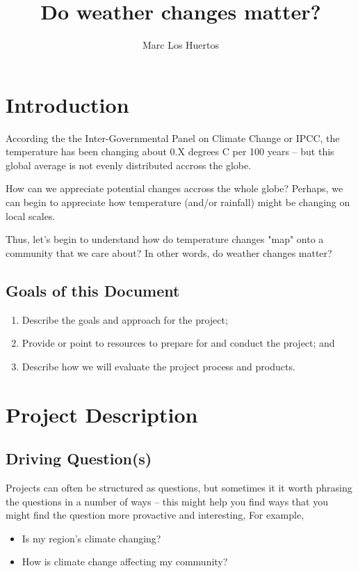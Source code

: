 \documentclass{article}\usepackage[]{graphicx}\usepackage[]{color}
\title{Do weather changes matter?}
\author{Marc Los Huertos}
\date{}
\begin{document}
\maketitle

\section{Introduction}

According the the Inter-Governmental Panel on Climate Change or IPCC, the temperature has been changing about 0.X degrees C per 100 years -- but this global average is not evenly distributed accross the globe. 

How can we appreciate potential changes accross the whole globe?  Perhaps, we can begin to appreciate how temperature (and/or rainfall) might be changing on local scales.

Thus, let's begin to understand how do temperature changes "map" onto a community that we care about? In other words, do weather changes matter?

\subsection{Goals of this Document}

\begin{enumerate}
  \item Describe the goals and approach for the project;
  \item Provide or point to resources to prepare for and conduct the project; and
  \item Describe how we will evaluate the project process and products.
\end{enumerate}

\section{Project Description}

\subsection{Driving Question(s)}

Projects can often be structured as questions, but sometimes it it worth phrasing the questions in a number of ways -- this might help you find ways that you might find the question more provactive and interesting, For example,

\begin{itemize}
  \item Is my region's climate changing?
  \item How is climate change affecting my community?
\end{itemize}
\end{document}
